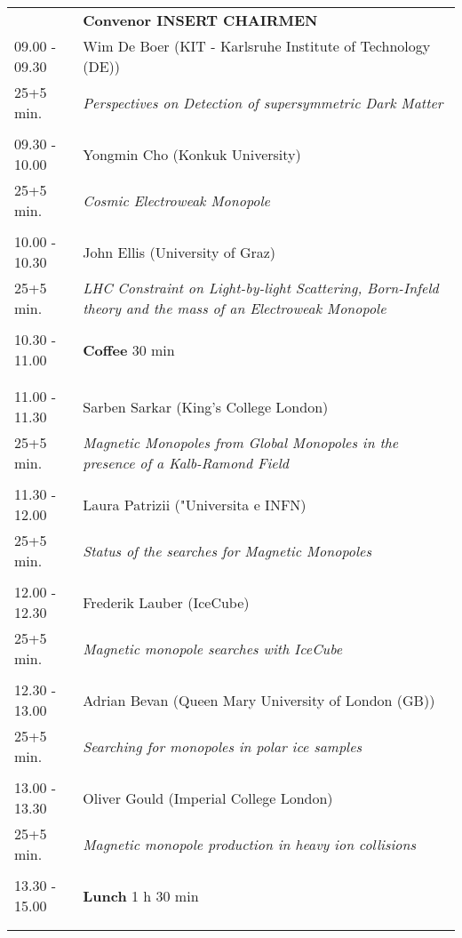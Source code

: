 \begin{longtable}{p{3cm}p{13cm}}
&\hfill {\bf Convenor INSERT CHAIRMEN }\\ 
09.00 - 09.30 & Wim De Boer (KIT - Karlsruhe Institute of  Technology (DE))\\ 
25+5 min. & {\it Perspectives on Detection of  supersymmetric Dark Matter}\\ 
 & \\ 
09.30 - 10.00 & Yongmin Cho (Konkuk University)\\ 
25+5 min. & {\it Cosmic Electroweak Monopole}\\ 
 & \\ 
10.00 - 10.30 & John Ellis (University of Graz)\\ 
25+5 min. & {\it LHC Constraint on Light-by-light Scattering, Born-Infeld theory and the mass of an Electroweak Monopole}\\ 
 & \\ 
10.30 - 11.00 & {\bf Coffee} \hfill 30 min \\ 
 & \\ 
 & \\ 
11.00 - 11.30 & Sarben Sarkar (King's College London)\\ 
25+5 min. & {\it Magnetic Monopoles from Global Monopoles in the presence of a Kalb-Ramond Field}\\ 
 & \\ 
11.30 - 12.00 & Laura Patrizii ("Universita e INFN)\\ 
25+5 min. & {\it Status of the searches for Magnetic Monopoles}\\ 
 & \\ 
12.00 - 12.30 & Frederik Lauber (IceCube)\\ 
25+5 min. & {\it Magnetic monopole searches with IceCube}\\ 
 & \\ 
12.30 - 13.00 & Adrian Bevan (Queen Mary University of London (GB))\\ 
25+5 min. & {\it Searching for monopoles in polar ice samples}\\ 
 & \\ 
13.00 - 13.30 & Oliver Gould (Imperial College London)\\ 
25+5 min. & {\it Magnetic monopole production in heavy ion collisions}\\ 
 & \\ 
13.30 - 15.00 & {\bf Lunch} \hfill 1 h 30 min \\ 
 & \\ 
 & \\ 

\end{longtable}
